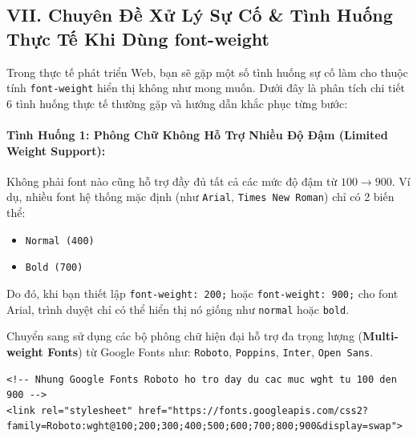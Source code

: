 \documentclass[11pt,oneside]{book}
\newcommand{\codeinline}[1]{\textcolor{accentOrange}{\texttt{#1}}}
\newcommand{\term}[1]{\textbf{\textcolor{primaryBlue}{#1}}}
\begin{document}
\subsection*{VII. Chuyên Đề Xử Lý Sự Cố \& Tình Huống Thực Tế Khi Dùng font-weight}

Trong thực tế phát triển Web, bạn sẽ gặp một số tình huống sự cố làm cho thuộc tính \codeinline{font-weight} hiển thị không như mong muốn. Dưới đây là phân tích chi tiết 6 tình huống thực tế thường gặp và hướng dẫn khắc phục từng bước:

\paragraph{Tình Huống 1: Phông Chữ Không Hỗ Trợ Nhiều Độ Đậm (Limited Weight Support):}

\begin{warnBox}
Không phải font nào cũng hỗ trợ đầy đủ tất cả các mức độ đậm từ $100 \rightarrow 900$. Ví dụ, nhiều font hệ thống mặc định (như \codeinline{Arial}, \codeinline{Times New Roman}) chỉ có 2 biến thể:
\begin{itemize}[leftmargin=1.5em, itemsep=2pt, parsep=0pt]
    \item \codeinline{Normal (400)}
    \item \codeinline{Bold (700)}
\end{itemize}
Do đó, khi bạn thiết lập \codeinline{font-weight: 200;} hoặc \codeinline{font-weight: 900;} cho font Arial, trình duyệt chỉ có thể hiển thị nó giống như \codeinline{normal} hoặc \codeinline{bold}.
\end{warnBox}

\begin{tipBox}
Chuyển sang sử dụng các bộ phông chữ hiện đại hỗ trợ đa trọng lượng (\term{Multi-weight Fonts}) từ Google Fonts như: \codeinline{Roboto}, \codeinline{Poppins}, \codeinline{Inter}, \codeinline{Open Sans}.
\end{tipBox}

\begin{codeWindow}
\begin{lstlisting}[language=HTML5]
<!-- Nhung Google Fonts Roboto ho tro day du cac muc wght tu 100 den 900 -->
<link rel="stylesheet" href="https://fonts.googleapis.com/css2?family=Roboto:wght@100;200;300;400;500;600;700;800;900&display=swap">
\end{lstlisting}
\end{codeWindow}
\end{document}
